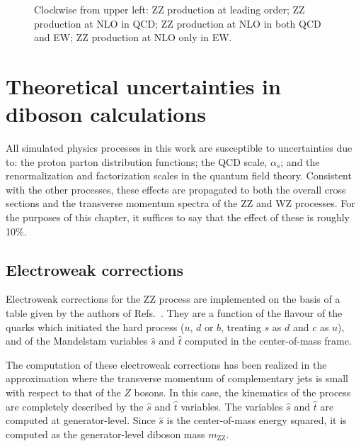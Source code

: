 \begin{figure}[thbp]
 \caption{Clockwise from upper left: ZZ production at leading order; ZZ production at NLO in QCD; ZZ production at NLO in both QCD and EW; ZZ production at NLO only in EW.} \label{fig:ZZto4l}
\end{figure}

\section{Theoretical uncertainties in diboson calculations}
\label{sec:vvtheo}
All simulated physics processes in this work are susceptible to uncertainties due to: the proton parton distribution functions; the QCD scale, $\alpha_s$; and the renormalization and factorization scales in the quantum field theory.
Consistent with the other processes, these effects are propagated to both the overall cross sections and the transverse momentum spectra of the ZZ and WZ processes.
For the purposes of this chapter, it suffices to say that the effect of these is roughly 10\%. 

\subsection{Electroweak corrections}
Electroweak corrections for the ZZ process are implemented
on the basis of a table given by the authors of Refs.~\cite{Bierweiler:2013dja,Gieseke:2014gka}.
They are a function of the flavour of the quarks
which initiated the hard process ($u$, $d$ or $b$, treating $s$ as $d$
and $c$ as $u$), and of the Mandelstam variables $\hat{s}$ and $\hat{t}$
computed in the center-of-mass frame.

The computation of these electroweak corrections has been realized in the
approximation where the transverse momentum of complementary jets is
small with respect to that of the $Z$ bosons. In this case, the
kinematics of the process are completely described by the $\hat{s}$ and
$\hat{t}$ variables.
The variables $\hat{s}$ and $\hat{t}$ are computed at generator-level.
Since $\hat{s}$ is the center-of-mass energy squared, 
it is computed as the generator-level diboson mass $m_\mathrm{ZZ}$.

